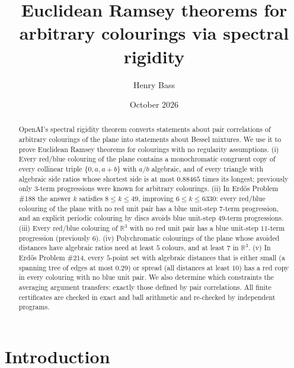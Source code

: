 \documentclass[11pt]{amsart}
\title[Euclidean Ramsey theorems for arbitrary colourings]{Euclidean Ramsey theorems for arbitrary colourings via spectral rigidity}
\author{Henry Bass}
\date{October 2026}
\theoremstyle{definition}
\newcommand{\R}{\mathbb{R}}
\begin{document}
\begin{abstract}
OpenAI's spectral rigidity theorem converts statements about pair correlations of arbitrary colourings of the plane into statements about Bessel mixtures. We use it to prove Euclidean Ramsey theorems for colourings with no regularity assumptions. (i) Every red/blue colouring of the plane contains a monochromatic congruent copy of every collinear triple $\{0,a,a+b\}$ with $a/b$ algebraic, and of every triangle with algebraic side ratios whose shortest side is at most $0.88465$ times its longest; previously only $3$-term progressions were known for arbitrary colourings. (ii) In Erd\H{o}s Problem \#188 the answer $k$ satisfies $8\le k\le 49$, improving $6\le k\le6330$: every red/blue colouring of the plane with no red unit pair has a blue unit-step $7$-term progression, and an explicit periodic colouring by discs avoids blue unit-step $49$-term progressions. (iii) Every red/blue colouring of $\R^3$ with no red unit pair has a blue unit-step $11$-term progression (previously $6$). (iv) Polychromatic colourings of the plane whose avoided distances have algebraic ratios need at least $5$ colours, and at least $7$ in $\R^3$. (v) In Erd\H{o}s Problem \#214, every $5$-point set with algebraic distances that is either small (a spanning tree of edges at most $0.29$) or spread (all distances at least $10$) has a red copy in every colouring with no blue unit pair. We also determine which constraints the averaging argument transfers: exactly those defined by pair correlations. All finite certificates are checked in exact and ball arithmetic and re-checked by independent programs.
\end{abstract}
\maketitle

\section{Introduction}
\end{document}
